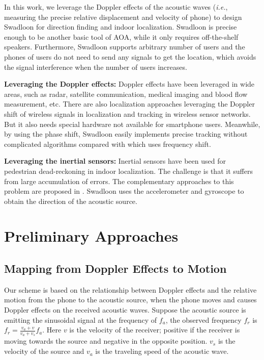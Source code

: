 \documentclass[]{sig-alternate-10pt}
\def\ie{\textit{i.e.}\xspace}
\def \ourprotocol{Swadloon\xspace}
\begin{document}
In this work, we leverage the Doppler effects of the acoustic waves
(\ie, measuring the precise relative displacement and velocity of phone) to
design \ourprotocol for direction finding and indoor localization.
\ourprotocol is precise enough to be another basic tool of AOA, while
it only requires off-the-shelf speakers.  Furthermore, \ourprotocol
supports arbitrary number of users and the phones of users do not
need to send any signals to get the location, which avoids the signal
interference when the number of users increases.

\noindent\textbf{Leveraging the Doppler effects:}
Doppler effects have been leveraged in wide areas, such as radar,
satellite communication, medical imaging and blood flow measurement,
etc. There are also localization approaches leveraging the Doppler
shift of wireless signals in localization
\cite{2008-SenSys-Spinningbeaconsprecise} and tracking
\cite{2007-SenSys-Trackingmobilenodes} in wireless sensor networks. But it also needs special hardware not available for smartphone users.
Meanwhile, by using the phase shift, \ourprotocol 
easily implements precise tracking without complicated algorithms
compared with \cite{ 2007-SenSys-Trackingmobilenodes} which uses
frequency shift.

\noindent\textbf{Leveraging the inertial sensors:} Inertial sensors
have been used for pedestrian dead-reckoning \cite{citeulike:7912602} in indoor
localization.  The challenge is that it suffers from large accumulation
of errors. The complementary
approaches to this problem are proposed in
\cite{Wang:2012:NNW:2307636.2307655, 2012-MOBICOM-Zeezeroeffort}.
\ourprotocol uses the accelerometer and gyroscope to obtain the
direction of the acoustic source.


\section{Preliminary Approaches}
\label{sec:pre}


\subsection{Mapping from Doppler Effects to Motion}
Our scheme is based on the relationship between Doppler effects and the
relative motion from the phone to the acoustic source, when the phone
moves and causes Doppler effects on the received acoustic waves.
Suppose the acoustic source is emitting the sinusoidal signal  at the frequency of $f_a$, the observed
frequency $f_r$  \cite{rosen2009encyclopedia} is
$f_{r}=\frac{v_{a}+v}{v_{a}+v_{s}}f_{a}$.
Here $v$ is the velocity of the receiver;
positive if the receiver is moving towards the source and negative in
the opposite position.  $v_s$ is the velocity of the source and $v_a$ is the traveling speed of the acoustic wave.
\end{document}
